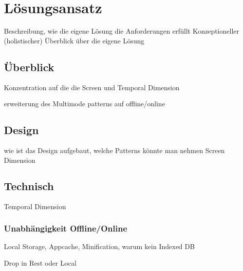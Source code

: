 \chapter{Lösungsansatz} 
\label{Kapitel 5}
Beschreibung, wie die eigene Lösung die Anforderungen erfüllt
Konzeptioneller (holistischer) Überblick über die eigene Lösung



\section{Überblick}

Konzentration auf die die Screen und Temporal Dimension

erweiterung des Multimode patterns auf offline/online

\section{Design}
wie ist das Design aufgebaut, welche Patterns könnte man nehmen
Screen Dimension


\section{Technisch}
Temporal Dimension

\subsection{Unabhängigkeit Offline/Online}\label{section:unabhaengigkeit_offline_online}
Local Storage, Appcache, Minification, warum kein Indexed DB

Drop in Rest oder Local


